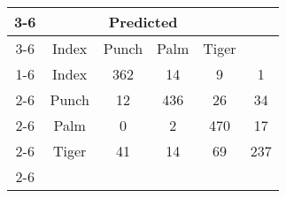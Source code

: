 \documentclass{standalone}
\begin{document}
 
 \begin{tabular}{|c |c |c |c |c |c |}
\cline{3-6}\multicolumn{2}{c|}{} & \multicolumn{4}{c|}{Predicted} \\ 
\cline{3-6} \multicolumn{2}{c |}{ } & Index & Punch & Palm & Tiger\\ 
\cline{1-6}\multirow{4}{*}{\rotatebox[origin=c]{90}{Actual}} & Index & 362 & 14 & 9 & 1\\ 
 \cline{2-6} & Punch & 12 & 436 & 26 & 34\\ 
 \cline{2-6} & Palm & 0 & 2 & 470 & 17\\ 
 \cline{2-6} & Tiger & 41 & 14 & 69 & 237\\ 
 \cline{2-6}\hline \end{tabular}
 
\end{document}
